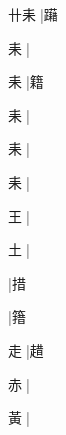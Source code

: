 \begin{multicols}{2}
{{\cjk{}卄耒{\cnxJzr{}}}|{\cjk{}躤}\par
{耒{\cnxJzr{}}}\mktsJzrVerticalBar{}{\cjk{}{\cnsym{}　}{\cnsym{}　}{\cnsym{}　}}|{}\par
{耒{\cnxJzr{}}}\mktsJzrVerticalBar{}{\cjk{}{\cnsym{}　}{\cnsym{}　}{\cnsym{}　}}|{\cjk{}籍}\par
{耒{\cnxJzr{}}}|{}\par
{耒{\cnxJzr{}}}|{}\par
{耒{\cnxJzr{}}}\mktsJzrVerticalBar{}{\cjk{}{\cnsym{}　}{\cnsym{}　}{\cnsym{}　}}|{}\par
{\cjk{}{\cnsym{}　}王{\cnxJzr{}}}\mktsJzrVerticalBar{}{\cjk{}{\cnsym{}　}{\cnsym{}　}{\cnsym{}　}}|{}\par
{\cjk{}{\cnsym{}　}土{\cnxJzr{}}}\mktsJzrVerticalBar{}{\cjk{}{\cnsym{}　}{\cnsym{}　}{\cnsym{}　}}|{}\par
{}\mktsJzrVerticalBar{}{\cjk{}{\cnsym{}　}{\cnsym{}　}{\cnsym{}　}}|{\cjk{}措}\par
{}\mktsJzrVerticalBar{}{\cjk{}{\cnsym{}　}{\cnsym{}　}{\cnsym{}　}}|{\cjk{}簎}\par
{\cjk{}{\cnsym{}　}走{\cnxJzr{}}}\mktsJzrVerticalBar{}{\cjk{}{\cnsym{}　}{\cnsym{}　}{\cnsym{}　}}|{\cjk{}趞}\par
{\cjk{}{\cnsym{}　}赤{\cnxJzr{}}}\mktsJzrVerticalBar{}{\cjk{}{\cnsym{}　}{\cnsym{}　}{\cnsym{}　}}|{}\par
{\cjk{}{\cnsym{}　}黃{\cnxJzr{}}}\mktsJzrVerticalBar{}{\cjk{}{\cnsym{}　}{\cnsym{}　}{\cnsym{}　}}|{}\par
}
\end{multicols}

